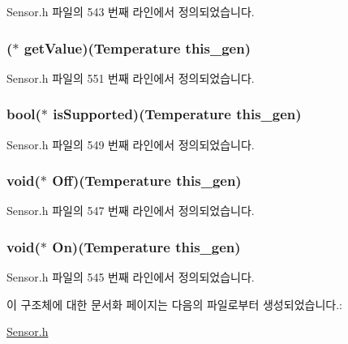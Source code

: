 Sensor.\-h 파일의 543 번째 라인에서 정의되었습니다.

\hypertarget{struct___temperature_a660cf710a2d1e34072bd9a1ab95d368b}{
\subsubsection[{get\-Value}]{($\ast$  get\-Value)({\bf Temperature} this\-\_\-gen)}}\label{struct___temperature_a660cf710a2d1e34072bd9a1ab95d368b}


Sensor.\-h 파일의 551 번째 라인에서 정의되었습니다.

\hypertarget{struct___temperature_a066c1b02fe31ddfb64ef783d1fefd1a2}{
\subsubsection[{is\-Supported}]{\setlength{\rightskip}{0pt plus 5cm}bool($\ast$  is\-Supported)({\bf Temperature} this\-\_\-gen)}}\label{struct___temperature_a066c1b02fe31ddfb64ef783d1fefd1a2}


Sensor.\-h 파일의 549 번째 라인에서 정의되었습니다.

\hypertarget{struct___temperature_a8c4b6d47c9f055fc483d5a46e565c756}{
\subsubsection[{Off}]{\setlength{\rightskip}{0pt plus 5cm}void($\ast$  Off)({\bf Temperature} this\-\_\-gen)}}\label{struct___temperature_a8c4b6d47c9f055fc483d5a46e565c756}


Sensor.\-h 파일의 547 번째 라인에서 정의되었습니다.

\hypertarget{struct___temperature_af7b298c4d127ff352cd1771cb90bd108}{
\subsubsection[{On}]{\setlength{\rightskip}{0pt plus 5cm}void($\ast$  On)({\bf Temperature} this\-\_\-gen)}}\label{struct___temperature_af7b298c4d127ff352cd1771cb90bd108}


Sensor.\-h 파일의 545 번째 라인에서 정의되었습니다.



이 구조체에 대한 문서화 페이지는 다음의 파일로부터 생성되었습니다.\-:\begin{DoxyCompactItemize}
\item 
\hyperlink{_sensor_8h}{Sensor.\-h}\end{DoxyCompactItemize}
